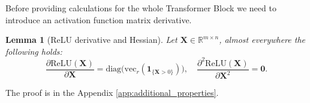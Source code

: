 \documentclass{article}
\newtheorem{lemma}{Lemma}
\begin{document}

Before providing calculations for the whole Transformer Block we need to introduce an activation function matrix derivative.


\begin{lemma}[ReLU derivative and Hessian] \label{lemma:relu_derivative_hessian}
Let $\mathbf{X} \in \mathbb{R}^{m \times n}$, almost everywhere the following holds:
\[ \frac{\partial \mathrm{ReLU}(\mathbf{X})}{\partial \mathbf{X}} = \mathrm{diag}\!\big(\mathrm{vec}_r(\mathbf{1}_{\{\mathbf{X}>0\}})\big), \quad \frac{\partial^2 \mathrm{ReLU}(\mathbf{X})}{\partial \mathbf{X}^2} = \mathbf{0}. \]
\end{lemma}
The proof is in the Appendix \ref{app:additional_properties}.



\end{document}
